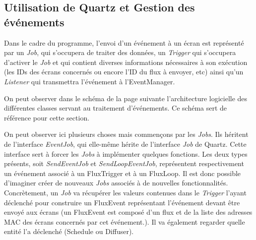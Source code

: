 \documentclass[french]{article}
\begin{document}
\subsection{Utilisation de Quartz et Gestion des événements}
Dans le cadre du programme, l'envoi d'un événement à un écran est représenté par un \textit{Job}, qui s'occupera de traiter des données, un \textit{Trigger} qui s'occupera d'activer le \textit{Job} et qui contient diverses informations nécessaires à son exécution (les IDs des écrans concernés ou encore l'ID du flux à envoyer, etc) ainsi qu'un \textit{Listener} qui transmettra l'événement à l'EventManager. \newline

On peut observer dans le schéma de la page suivante l'architecture logicielle des différentes classes servant au traitement d'événements. Ce schéma sert de référence pour cette section.\newline

On peut observer ici plusieurs choses mais commençons par les \textit{Jobs}. Ils héritent de l'interface \textit{EventJob}, qui elle-même hérite de l'interface \textit{Job} de Quartz. Cette interface sert à forcer les \textit{Jobs} à implémenter quelques fonctions. Les deux types présents, soit \textit{SendEventJob} et \textit{SendLoopEventJob}, représentent respectivement un événement associé à un FluxTrigger et à un FluxLoop. Il est donc possible d'imaginer créer de nouveaux \textit{Jobs} associés à de nouvelles fonctionnalités. \newline
Concrètement, un \textit{Job} va récupérer les valeurs contenues dans le \textit{Trigger} l'ayant déclenché pour construire un FluxEvent représentant l'événement devant être envoyé aux écrans (un FluxEvent est composé d'un flux et de la liste des adresses MAC des écrans concernés par cet événement.). Il va également regarder quelle entité l'a déclenché (Schedule ou Diffuser). \newline
\end{document}
